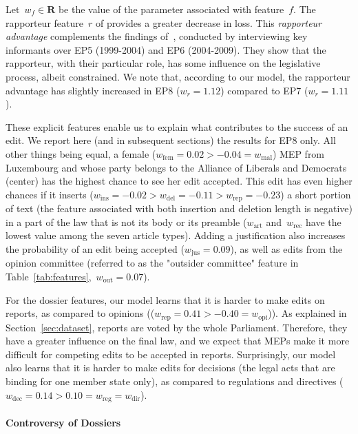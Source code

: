 Let~$w_f \in \mathbf{R}$ be the value of the parameter associated with feature~$f$.
The rapporteur feature~$r$ of  provides a greater decrease in loss.
This \textit{rapporteur advantage} complements the findings of~\citet{costello2010policy}, conducted by interviewing key informants over EP5 (1999-2004) and EP6 (2004-2009).
They show that the rapporteur, with their particular role, has some influence on the legislative process, albeit constrained.
We note that, according to our model, the rapporteur advantage has slightly increased in EP8 ($w_r=1.12$) compared to EP7 ($w_r=1.11$).

These explicit features enable us to explain what contributes to the success of an edit.
We report here (and in subsequent sections) the results for EP8 only.
All other things being equal, a female ($w_{\text{fem}}=0.02 > -0.04 = w_{\text{mal}}$) MEP from Luxembourg and whose party belongs to the Alliance of Liberals and Democrats (center) has the highest chance to see her edit accepted.
This edit has even higher chances if it inserts ($w_{\text{ins}}=-0.02 > w_{\text{del}}=-0.11 > w_{\text{rep}}=-0.23$) a short portion of text (the feature associated with both insertion and deletion length is negative) in a part of the law that is not its body or its preamble ($w_{\text{art}}$ and~$w_{\text{rec}}$ have the lowest value among the seven article types).
Adding a justification also increases the probability of an edit being accepted ($w_{\text{jus}}=0.09$), as well as edits from the opinion committee (referred to as the "outsider committee" feature in Table~\ref{tab:features},~$w_{\text{out}} =  0.07$).

For the dossier features, our model learns that it is harder to make edits on reports, as compared to opinions (($w_{\text{rep}}=0.41 > -0.40 = w_{\text{opi}}$)).
As explained in Section~\ref{sec:dataset}, reports are voted by the whole Parliament.
Therefore, they have a greater influence on the final law, and we expect that MEPs make it more difficult for competing edits to be accepted in reports.
Surprisingly, our model also learns that it is harder to make edits for decisions (the legal acts that are binding for one member state only), as compared to regulations and directives ($w_{\text{dec}}=0.14 > 0.10 = w_{\text{reg}} = w_{\text{dir}}$).

\paragraph{Controversy of Dossiers}

